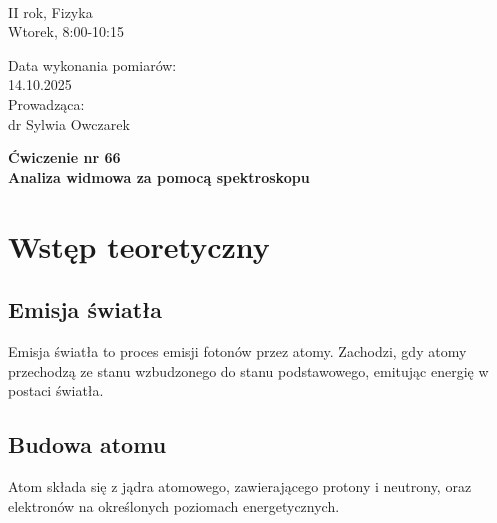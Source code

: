 \documentclass[a4paper,12pt]{article}
\begin{document}
\noindent
\begin{minipage}{0.5\textwidth}
    \raggedright
    \textbf{} \\
    II rok, Fizyka \\
    Wtorek, 8:00-10:15 \\
    \vspace{0.5cm}
    \vspace{0.5cm}
\end{minipage}%
\begin{minipage}{0.5\textwidth}
    \raggedleft
    Data wykonania pomiarów: \\
    14.10.2025 \\
    \vspace{0.5cm}
    Prowadząca: \\
    dr Sylwia Owczarek
\end{minipage}

\vspace{2cm}
\begin{center}
    \LARGE \textbf{Ćwiczenie nr 66} \\[0.5cm]
    \Large \textbf{Analiza widmowa za pomocą spektroskopu}
\end{center}

\vspace{1cm} %
\noindent

\tableofcontents
\newpage

\section{Wstęp teoretyczny}

\subsection*{Emisja światła}

Emisja światła to proces emisji fotonów przez atomy. Zachodzi, gdy atomy przechodzą ze stanu wzbudzonego do stanu podstawowego, emitując energię w postaci światła.~\cite{Drynski1976}

\subsection*{Budowa atomu}

Atom składa się z jądra atomowego, zawierającego protony i neutrony, oraz elektronów na określonych poziomach energetycznych.~\cite{Drynski1976}
\end{document}
